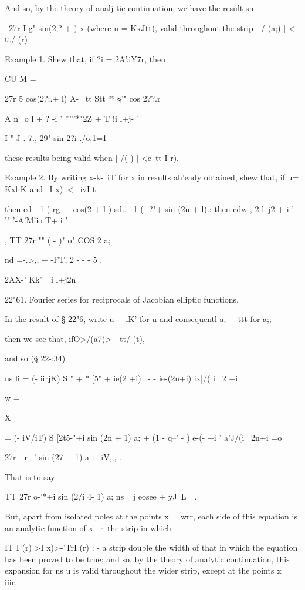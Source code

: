 And so, by the theory of analj tic continuation, we have the result sn

\ 27r I g" sin(2;? + ) x (where u = KxJtt), valid throughout the strip
[ / (a;) | < - tt/ (r)

Example 1. Shew that, if ?i = 2A'.iY7r, then

CU M =

27r 5 cos(2?;.+ l) A- \ tt Stt °° §'" cos 2??.r

A n=o l + ? -i ' '''''*"2Z + T !i l+j- '

I " J . 7., 29" sin 2?i ./o,1=1 %

these results being valid when | /( ) | <c\ tt I r).

Example 2. By writing x-k-\ iT for x in results ah'eady obtained, shew
that, if u= Kxl-K and \ I x)\ < \ ivI t\

then cd - 1 (-rg--+ cos(2 + l ) sd..-- 1 (- ?"+ sin (2n + l).: then
cdw-, 2 l\ j2 + i ' '" '-A'M'io T+ i '

, TT 27r "" ( - )" o" COS 2 a;

nd =-.>,, + -FT, 2 - - - 5 .

2AX-' Kk' =i l+j2n

22"61. Fourier series for reciprocals of Jacobian elliptic functions.

In the result of § 22"6, write u + iK' for u and consequentl a; + ttt
for a;;

then we see that, ifO>/(a7)> - tt/ (t),

and so (§ 22-:34)

ns li = (- iirjK) S " + * [5" + ie(2 +i) \ - - ie-(2n+i) ix|/( i \ 2
+i

w =

X

= (- iV/iT) S [2t5-"+i sin (2n + 1) a; + (1 - q--' - ) e-(- +i '
a'J/(i \ 2n+i =o

  27r - r+' sin (27 + 1) a : \ iV,,, .

That is to say

TT 27r o-'*+i sin (2/i 4- 1) a; ns =j eosee + yJ\ L\ \ .

But, apart from isolated poles at the points x = wrr, each side of
this equation is an analytic function of x \ r\ the strip in which

IT I (r) >I x)>-'TrI (r) : - a strip double the width of that in which
the equation has been proved to be true; and so, by the theory of
analytic continuation, this expansion for ns u is valid throughout the
wider strip, except at the points x = iiir.

